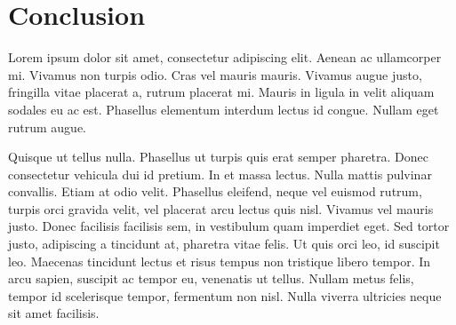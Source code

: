 \chapter*{Conclusion}

Lorem ipsum dolor sit amet, consectetur adipiscing elit. Aenean ac
ullamcorper mi. Vivamus non turpis odio. Cras vel mauris mauris. Vivamus
augue justo, fringilla vitae placerat a, rutrum placerat mi. Mauris in
ligula in velit aliquam sodales eu ac est. Phasellus elementum interdum
lectus id congue. Nullam eget rutrum augue.

Quisque ut tellus nulla. Phasellus ut turpis quis erat semper pharetra.
Donec consectetur vehicula dui id pretium. In et massa lectus. Nulla mattis
pulvinar convallis. Etiam at odio velit. Phasellus eleifend, neque vel
euismod rutrum, turpis orci gravida velit, vel placerat arcu lectus quis
nisl. Vivamus vel mauris justo. Donec facilisis facilisis sem, in vestibulum
quam imperdiet eget. Sed tortor justo, adipiscing a tincidunt at, pharetra
vitae felis. Ut quis orci leo, id suscipit leo. Maecenas tincidunt lectus et
risus tempus non tristique libero tempor. In arcu sapien, suscipit ac tempor
eu, venenatis ut tellus. Nullam metus felis, tempor id scelerisque tempor,
fermentum non nisl. Nulla viverra ultricies neque sit amet facilisis.
  
